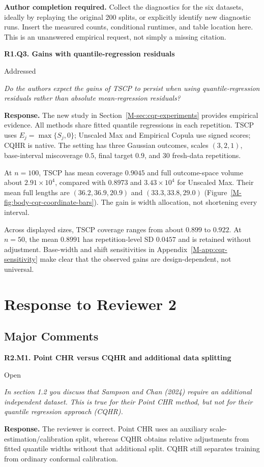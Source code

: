 \documentclass[11pt]{article}
\newcommand{\mssec}[1]{Section~\ref*{M-#1}}
\newcommand{\msapp}[1]{Appendix~\ref*{M-#1}}
\newcommand{\msfig}[1]{Figure~\ref*{M-#1}}
\newcommand{\action}[1]{\par{\small\color{ActionRed}\textbf{Author completion required.} #1\par}}
\newcommand{\point}[3]{\par\Needspace{7\baselineskip}\medskip
\noindent\parbox[t]{0.77\linewidth}{\textbf{#1}}\hfill
\parbox[t]{0.21\linewidth}{\raggedleft\small\sffamily #2}\par\nopagebreak
{\color{ReviewerBlue}\small\itshape #3\par}\textbf{Response.} }
\begin{document}
\action{Collect the diagnostics for the six datasets, ideally by replaying the original 200 splits, or explicitly identify new diagnostic runs. Insert the measured counts, conditional runtimes, and table location here. This is an unanswered empirical request, not simply a missing citation.}

\point{R1.Q3. Gains with quantile-regression residuals}{Addressed}{Do the authors expect the gains of TSCP to persist when using
quantile-regression residuals rather than absolute mean-regression
residuals?}
\label{response:R1.Q3}
The new study in \mssec{sec:cqr-experiments} provides empirical evidence. All methods share fitted quantile regressions in each repetition. TSCP uses $E_j=\max\{S_j,0\}$; Unscaled Max and Empirical Copula use signed scores; CQHR is native. The setting has three Gaussian outcomes, scales $(3,2,1)$, base-interval miscoverage $0.5$, final target $0.9$, and 30 fresh-data repetitions.

At $n=100$, TSCP has mean coverage $0.9045$ and full outcome-space volume about $2.91\times10^4$, compared with $0.8973$ and $3.43\times10^4$ for Unscaled Max. Their mean full lengths are $(36.2,36.9,20.9)$ and $(33.3,33.8,29.0)$ (\msfig{fig:body-cqr-coordinate-bars}). The gain is width allocation, not shortening every interval.

Across displayed sizes, TSCP coverage ranges from about $0.899$ to $0.922$. At $n=50$, the mean $0.8991$ has repetition-level SD $0.0457$ and is retained without adjustment. Base-width and shift sensitivities in \msapp{app:cqr-sensitivity} make clear that the observed gains are design-dependent, not universal.

\clearpage
\section*{Response to Reviewer 2}
\subsection*{Major Comments}

\point{R2.M1. Point CHR versus CQHR and additional data splitting}{Open}{In section 1.2 you discuss that Sampson and Chan (2024) require an
additional independent dataset. This is true for their Point CHR
method, but not for their quantile regression approach (CQHR).}
\label{response:R2.M1}
The reviewer is correct. Point CHR uses an auxiliary scale-estimation/calibration split, whereas CQHR obtains relative adjustments from fitted quantile widths without that additional split. CQHR still separates training from ordinary conformal calibration.
\end{document}
